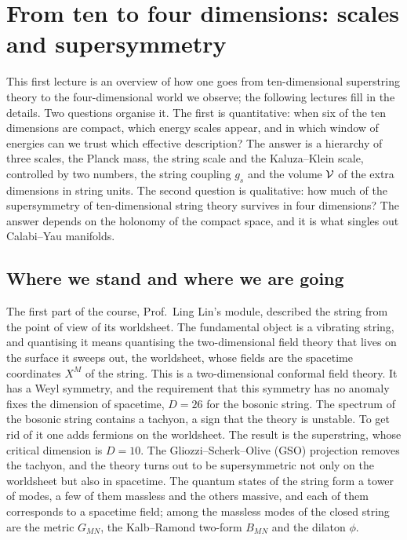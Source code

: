 \chapter{From ten to four dimensions: scales and supersymmetry}
\label{ch:L1}

This first lecture is an overview of how one goes from ten-dimensional superstring theory to the four-dimensional world we observe; the following lectures fill in the details. Two questions organise it. The first is quantitative: when six of the ten dimensions are compact, which energy scales appear, and in which window of energies can we trust which effective description? The answer is a hierarchy of three scales, the Planck mass, the string scale and the Kaluza--Klein scale, controlled by two numbers, the string coupling $g_s$ and the volume $\mathcal{V}$ of the extra dimensions in string units. The second question is qualitative: how much of the supersymmetry of ten-dimensional string theory survives in four dimensions? The answer depends on the holonomy of the compact space, and it is what singles out Calabi--Yau manifolds.

\section{Where we stand and where we are going}
\label{sec:L1-aims}

The first part of the course, Prof.\ Ling Lin's module, described the string from the point of view of its worldsheet. The fundamental object is a vibrating string, and quantising it means quantising the two-dimensional field theory that lives on the surface it sweeps out, the worldsheet, whose fields are the spacetime coordinates $X^M$ of the string. This is a two-dimensional conformal field theory. It has a Weyl symmetry, and the requirement that this symmetry has no anomaly fixes the dimension of spacetime, $D = 26$ for the bosonic string. The spectrum of the bosonic string contains a tachyon, a sign that the theory is unstable. To get rid of it one adds fermions on the worldsheet. The result is the superstring, whose critical dimension is $D=10$. The Gliozzi--Scherk--Olive (GSO) projection removes the tachyon, and the theory turns out to be supersymmetric not only on the worldsheet but also in spacetime. The quantum states of the string form a tower of modes, a few of them massless and the others massive, and each of them corresponds to a spacetime field; among the massless modes of the closed string are the metric $G_{MN}$, the Kalb--Ramond two-form $B_{MN}$ and the dilaton $\phi$.


